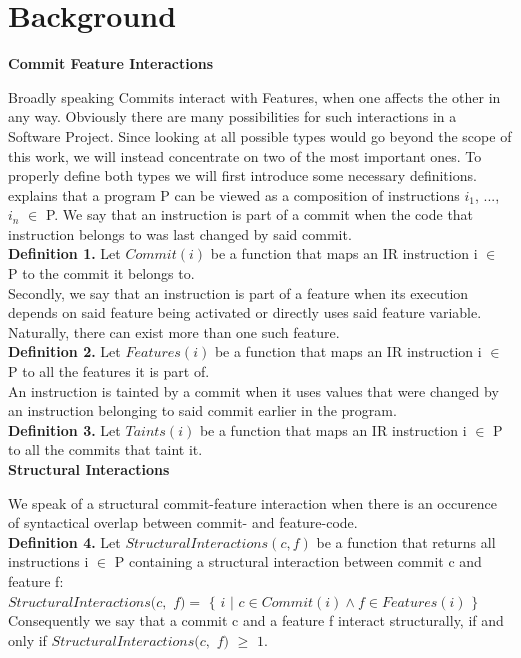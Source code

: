 \section*{Background}\label{ch:background}

\textbf{Commit Feature Interactions}

Broadly speaking Commits interact with Features, when one affects the other in any way.
Obviously there are many possibilities for such interactions in a Software Project.
Since looking at all possible types would go beyond the scope of this work, we will instead concentrate on two of the most important ones.
To properly define both types we will first introduce some necessary definitions. \\
\citet{sattler2023seal} explains that a program P can be viewed as a composition of instructions $i_1$, ..., $i_n$ $\in$ P.
We say that an instruction is part of a commit when the code that instruction belongs to was last changed by said commit. \\
\textbf{Definition 1.} Let $Commit(i)$ be a function that maps an IR instruction i $\in$ P to the commit it belongs to. \\
Secondly, we say that an instruction is part of a feature when its execution depends on said feature being activated or directly uses said feature variable. 
Naturally, there can exist more than one such feature. \\
\textbf{Definition 2.} Let $Features(i)$ be a function that maps an IR instruction i $\in$ P to all the features it is part of. \\
An instruction is tainted by a commit when it uses values that were changed by an instruction belonging to said commit earlier in the program. \\
\textbf{Definition 3.} Let $Taints(i)$ be a function that maps an IR instruction i $\in$ P to all the commits that taint it. \\

\textbf{Structural Interactions} 

We speak of a structural commit-feature interaction when there is an occurence of syntactical overlap between commit- and feature-code. \\
\textbf{Definition 4.} Let $StructuralInteractions(c, f)$ be a function that returns all instructions i $\in$ P containing a structural interaction between commit c and feature f: \\
$StructuralInteractions(c,$ $f) = $ $\{$ $i$ $|$ $ c \in Commit(i) \land f \in Features(i)$ $\}$ \\
Consequently we say that a commit c and a feature f interact structurally, if and only if $StructuralInteractions(c,$ $f)$ $\geq$ $1$. \\

